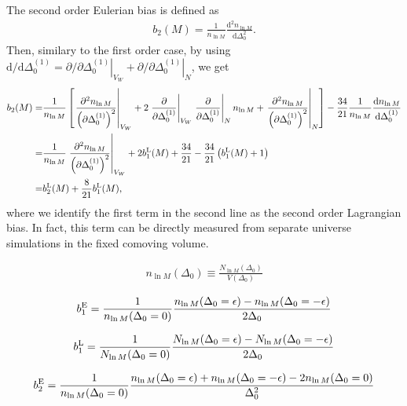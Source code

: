 \documentclass[a4paper,11pt]{article}
\renewcommand{\d}{\mathrm{d}}
\begin{document}
The second order Eulerian bias is defined as
\begin{align}
b_2(M) = \frac{1}{n_{\ln{M}}}\frac{\d^2 n_{\ln{M}}}{\d \Delta_0^2}.
\end{align}
Then, similary to the first order case, by using
$ \d/\d\Delta_0^{(1)}=
\left.\partial/\partial\Delta_0^{(1)}\right|_{V_W} 
+\left.\partial/\partial\Delta_0^{(1)}\right|_{N}$,
we get
\begin{align}
b_2(M)
=&\frac{1}{n_{\ln{M}}}
\left[ \left.\frac{\partial^2 n_{\ln{M}} }{\left(\partial \Delta_0^{(1)}\right)^2}\right|_{V_W} 
+ 2 \left.\frac{\partial}{\partial \Delta_0^{(1)}}\right|_{V_W}
\left.\frac{\partial}{\partial \Delta_0^{(1)}}\right|_{N}n_{\ln{M}}
+ \left.\frac{\partial^2 n_{\ln{M}}  }{\left(\partial \Delta_0^{(1)}\right)^2}\right|_{N} \right]
-\frac{34}{21}
\frac{1}{n_{\ln{M}}}
\frac{\d n_{\ln{M}}}{\d \Delta_0^{(1)} }
\nonumber\\
=&\frac{1}{n_{\ln{M}}}\left.\frac{\partial^2 n_{\ln{M}} }{\left(\partial \Delta_0^{(1)}\right)^2}\right|_{V_W} 
+2b_1^{\rm L}(M) + \frac{34}{21} 
- \frac{34}{21}\left( b_1^{\rm L}(M) + 1 \right)
\nonumber\\
=&b_2^{\rm L}(M) + \frac{8}{21}b_1^{\rm L}(M),
\end{align}
where we identify the first term in the second line as the second order Lagrangian bias.
In fact, this term can be directly measured from separate universe simulations in the fixed comoving volume.

\begin{align}
n_{\ln{M}}(\Delta_{0}) \equiv
\frac{N_{\ln{M}}(\Delta_{0})}{V(\Delta_{0})}
\end{align}

\begin{align}
b^{\rm E}_{1}
= \frac{1}{n_{\ln{M}}(\Delta_0=0)}
\frac{n_{\ln{M}}(\Delta_0=\epsilon)
-
n_{\ln{M}}(\Delta_0=-\epsilon)
}{2\Delta_0}
\end{align}


\begin{align}
b^{\rm L}_{1}
= \frac{1}{N_{\ln{M}}(\Delta_0=0)}
\frac{N_{\ln{M}}(\Delta_0=\epsilon)
-
N_{\ln{M}}(\Delta_0=-\epsilon)
}{2\Delta_0}
\end{align}


\begin{align}
b^{\rm E}_{2}
= \frac{1}{n_{\ln{M}}(\Delta_0=0)}
\frac{n_{\ln{M}}(\Delta_0=\epsilon)
+
n_{\ln{M}}(\Delta_0=-\epsilon)
-2n_{\ln{M}}(\Delta_0=0)}{\Delta^2_0}
\end{align}
\end{document}
